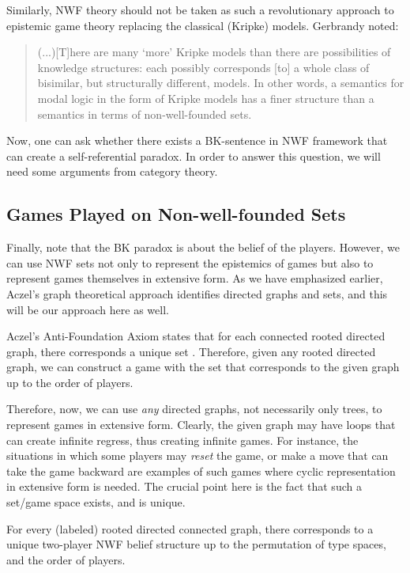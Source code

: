 \documentclass{article}
\begin{document}
Similarly, NWF theory should not be taken as such a revolutionary approach to epistemic game theory replacing the classical (Kripke) models. Gerbrandy noted:

\begin{quote}
(...)[T]here are many `more' Kripke models than there are possibilities of knowledge structures: each possibly corresponds [to] a whole class of bisimilar, but structurally different, models. In other words, a semantics for modal logic in the form of Kripke models has a finer structure than a semantics in terms of non-well-founded sets.
 
\cite{ger}
\end{quote}

Now, one can ask whether there exists a BK-sentence in NWF framework that can create a self-referential paradox. In order to answer this question, we will need some arguments from category theory.

\subsection{Games Played on Non-well-founded Sets}

Finally, note that the BK paradox is about the belief of the players. However, we can use NWF sets not only to represent the epistemics of games but also to represent games themselves in extensive form. As we have emphasized earlier, Aczel's graph theoretical approach identifies directed graphs and sets, and this will be our approach here as well.

Aczel's Anti-Foundation Axiom states that for each connected rooted directed graph, there corresponds a unique set \cite{acz}. Therefore, given any rooted directed graph, we can construct a game with the set that corresponds to the given graph up to the order of players.

Therefore, now, we can use \emph{any} directed graphs, not necessarily only trees, to represent games in extensive form. Clearly, the given graph may have loops that can create infinite regress, thus creating infinite games. For instance, the situations in which some players may \emph{reset} the game, or make a move that can take  the game backward are examples of such games where cyclic representation in extensive form is needed. The crucial point here is the fact that such a set/game space exists, and is unique.

\begin{thm}{\label{teo-universal}}
For every (labeled) rooted directed connected graph, there corresponds to a unique two-player NWF belief structure up to the permutation of type spaces, and the order of players.
\end{thm}
\end{document}
